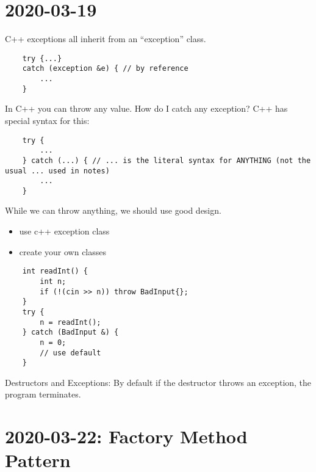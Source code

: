 \section{2020-03-19}
C++ exceptions all inherit from an ``exception'' class.
\begin{lstlisting}
    try {...}
    catch (exception &e) { // by reference
        ...
    }
\end{lstlisting}
In C++ you can throw any value. How do I catch any exception? C++ has special syntax for this:
\begin{lstlisting}
    try {
        ...
    } catch (...) { // ... is the literal syntax for ANYTHING (not the usual ... used in notes)
        ...
    }
\end{lstlisting}
While we can throw anything, we should use good design.
\begin{itemize}
    \item use c++ exception class
          \subitem {}
          \subitem {}
    \item create your own classes
          \subitem {}
          \subitem {}
\end{itemize}
\begin{lstlisting}
    int readInt() {
        int n;
        if (!(cin >> n)) throw BadInput{};
    }
    try {
        n = readInt();
    } catch (BadInput &) {
        n = 0;
        // use default
    }
\end{lstlisting}
Destructors and Exceptions: By default if the destructor throws an exception, the program
terminates.
\section{2020-03-22: Factory Method Pattern}
